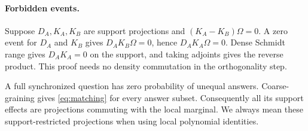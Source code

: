 \paragraph{Forbidden events.}
Suppose $D_A,K_A,K_B$ are support projections and $(K_A-K_B)\Omega=0$. A zero event for $D_A$ and $K_B$ gives $D_AK_B\Omega=0$, hence $D_AK_A\Omega=0$. Dense Schmidt range gives $D_AK_A=0$ on the support, and taking adjoints gives the reverse product. This proof needs no density commutation in the orthogonality step.

A full synchronized question has zero probability of unequal answers. Coarse-graining gives \eqref{eq:matching} for every answer subset. Consequently all its support effects are projections commuting with the local marginal. We always mean these support-restricted projections when using local polynomial identities.
